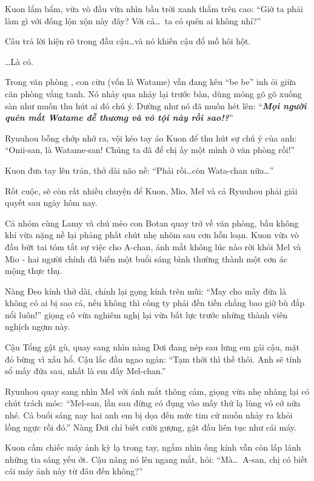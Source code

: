\documentclass[../main.tex]{subfiles}
\begin{document}
Kuon lẩm bẩm, vừa vò đầu vừa nhìn bầu trời xanh thẳm trên cao: ``Giờ ta phải làm gì với đống lộn xộn này đây? Với cả\dots\ ta có quên ai không nhỉ?''

Câu trả lời hiện rõ trong đầu cậu\dots và nó khiến cậu đổ mồ hôi hột.

\dots Là có.

Trong văn phòng \hll, con cừu (vốn là Watame) vẫn đang kêu ``be be'' inh ỏi giữa căn phòng vắng tanh. Nó nhảy qua nhảy lại trước bàn, dùng móng gõ gõ xuống sàn như muốn thu hút ai đó chú ý. Dường như nó đã muốn hét lên: ``\textbf{\textit{Mọi người quên mất Watame dễ thương và vô tội này rồi sao!?}}''

Ryuuhou bỗng chớp nhớ ra, vội kéo tay áo Kuon để thu hút sự chú ý của anh: ``Onii-san, là Watame-san! Chúng ta đã để chị ấy một mình ở văn phòng rồi!''

Kuon đưa tay lên trán, thở dài não nề: ``Phải rồi\dots còn Wata-chan nữa\dots''

Rốt cuộc, sẽ còn rất nhiều chuyện để Kuon, Mio, Mel và cả Ryuuhou phải giải quyết sau ngày hôm nay.
\omk

Cả nhóm cùng Lamy và chú mèo con Botan quay trở về văn phòng, bầu không khí vừa nặng nề lại phảng phất chút nhẹ nhõm sau cơn hỗn loạn. Kuon vừa vò đầu bứt tai tóm tắt sự việc cho A-chan, ánh mắt không lúc nào rời khỏi Mel và Mio - hai người chính đã biến một buổi sáng bình thường thành một cơn ác mộng thực thụ.

Nàng Đeo kính thở dài, chỉnh lại gọng kính trên mũi: ``May cho mấy đứa là không có ai bị sao cả, nếu không thì công ty phải đền tiền chẳng bao giờ bù đắp nổi luôn!'' giọng cô vừa nghiêm nghị lại vừa bất lực trước những thành viên nghịch ngợm này.

Cậu Tổng gật gù, quay sang nhìn nàng Dơi đang nép sau lưng em gái cậu, mặt đỏ bừng vì xấu hổ. Cậu lắc đầu ngao ngán: ``Tạm thời thì thế thôi. Anh sẽ tính sổ mấy đứa sau, nhất là em đấy Mel-chan.''

Ryuuhou quay sang nhìn Mel với ánh mắt thông cảm, giọng vừa nhẹ nhàng lại có chút trách móc: ``Mel-san, lần sau đừng có đụng vào mấy thứ lạ lùng vô cớ nữa nhé. Cả buổi sáng nay hai anh em bị dọa đến mức tim cứ muốn nhảy ra khỏi lồng ngực rồi đó.'' Nàng Dơi chỉ biết cười gượng, gật đầu liên tục như cái máy.

Kuon cầm chiếc máy ảnh kỳ lạ trong tay, ngắm nhìn ống kính vẫn còn lấp lánh những tia sáng yếu ớt. Cậu nâng nó lên ngang mắt, hỏi: ``Mà\dots\ A-san, chị có biết cái máy ảnh này từ đâu đến không?''
\end{document}
